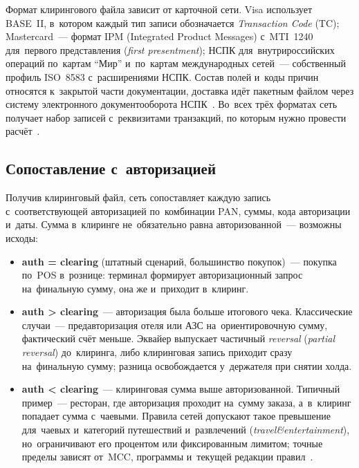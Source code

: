 Формат клирингового файла зависит от карточной сети. Visa использует BASE~II,
в~котором каждый тип записи обозначается \textit{Transaction Code} (TC);
Mastercard~--- формат IPM (Integrated Product Messages) с~MTI~1240 для~первого
представления (\textit{first presentment}); НСПК
для~внутрироссийских операций по~картам \enquote{Мир} и~по~картам международных
сетей~--- собственный профиль ISO~8583 с~расширениями НСПК. Состав полей и~коды
причин относятся к~закрытой части документации, доставка идёт пакетным файлом
через систему электронного документооборота НСПК~\cite{nspk-mir-rules}. Во~всех
трёх форматах сеть получает набор записей с~реквизитами транзакций, по которым
нужно провести расчёт~\cite{visa-core-rules,mc-rules}.

\subsection*{Сопоставление с~авторизацией}

Получив клиринговый файл, сеть сопоставляет каждую запись с~соответствующей
авторизацией по~комбинации PAN, суммы, кода авторизации и~даты. Сумма
в~клиринге не~обязательно равна авторизованной~--- возможны исходы:

\begin{itemize}
  \item \textbf{auth = clearing} (штатный сценарий, большинство покупок)~---
    покупка по~POS в~рознице: терминал формирует авторизационный запрос
    на~финальную сумму, она же и~приходит в~клиринг.
  \item \textbf{auth > clearing}~--- авторизация была больше итогового чека.
    Классические случаи~--- предавторизация отеля или АЗС
    на~ориентировочную сумму, фактический счёт меньше. Эквайер выпускает
    частичный \textit{reversal} (\textit{partial reversal}) до~клиринга, либо
    клиринговая запись приходит сразу на~финальную сумму; разница
    освобождается у~держателя при снятии холда.
  \item \textbf{auth < clearing}~--- клиринговая сумма выше авторизованной.
    Типичный пример~--- ресторан, где авторизация проходит на~сумму заказа,
    а~в~клиринг попадает сумма с~чаевыми. Правила сетей допускают такое
    превышение для~чаевых и~категорий путешествий и~развлечений (\textit{travel\&entertainment}),
    но~ограничивают его процентом или фиксированным лимитом; точные пределы
    зависят от~MCC, программы и~текущей редакции
    правил~\cite{visa-core-rules,mc-rules}.
\end{itemize}


